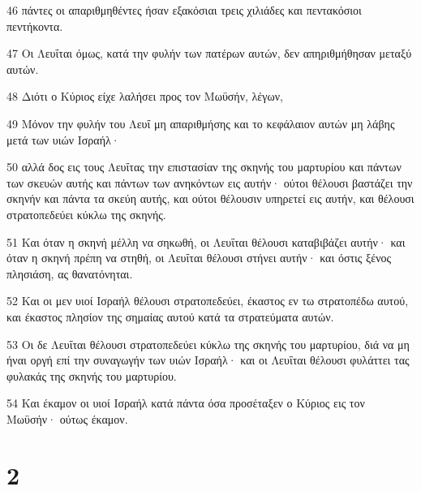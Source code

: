 \par 46 πάντες οι απαριθμηθέντες ήσαν εξακόσιαι τρεις χιλιάδες και πεντακόσιοι πεντήκοντα.
\par 47 Οι Λευΐται όμως, κατά την φυλήν των πατέρων αυτών, δεν απηριθμήθησαν μεταξύ αυτών.
\par 48 Διότι ο Κύριος είχε λαλήσει προς τον Μωϋσήν, λέγων,
\par 49 Μόνον την φυλήν του Λευΐ μη απαριθμήσης και το κεφάλαιον αυτών μη λάβης μετά των υιών Ισραήλ·
\par 50 αλλά δος εις τους Λευΐτας την επιστασίαν της σκηνής του μαρτυρίου και πάντων των σκευών αυτής και πάντων των ανηκόντων εις αυτήν· ούτοι θέλουσι βαστάζει την σκηνήν και πάντα τα σκεύη αυτής, και ούτοι θέλουσιν υπηρετεί εις αυτήν, και θέλουσι στρατοπεδεύει κύκλω της σκηνής.
\par 51 Και όταν η σκηνή μέλλη να σηκωθή, οι Λευΐται θέλουσι καταβιβάζει αυτήν· και όταν η σκηνή πρέπη να στηθή, οι Λευΐται θέλουσι στήνει αυτήν· και όστις ξένος πλησιάση, ας θανατόνηται.
\par 52 Και οι μεν υιοί Ισραήλ θέλουσι στρατοπεδεύει, έκαστος εν τω στρατοπέδω αυτού, και έκαστος πλησίον της σημαίας αυτού κατά τα στρατεύματα αυτών.
\par 53 Οι δε Λευΐται θέλουσι στρατοπεδεύει κύκλω της σκηνής του μαρτυρίου, διά να μη ήναι οργή επί την συναγωγήν των υιών Ισραήλ· και οι Λευΐται θέλουσι φυλάττει τας φυλακάς της σκηνής του μαρτυρίου.
\par 54 Και έκαμον οι υιοί Ισραήλ κατά πάντα όσα προσέταξεν ο Κύριος εις τον Μωϋσήν· ούτως έκαμον.

\chapter{2}

